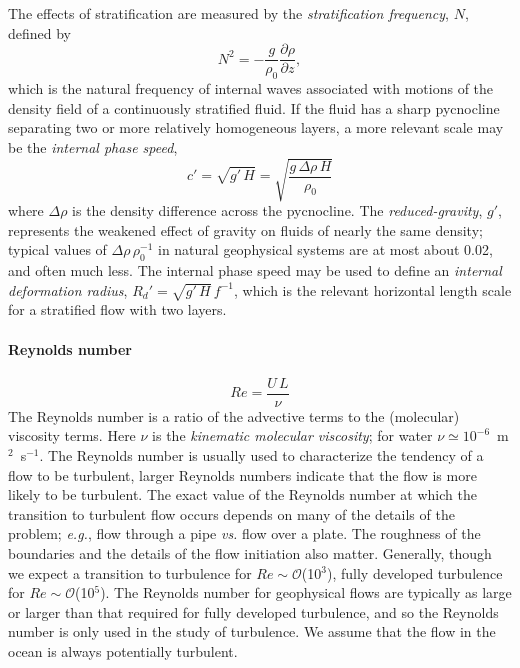 \documentclass[11pt]{report}
\numberwithin{equation}{section}
\begin{document}
The effects of stratification are measured by the {\it stratification frequency}, $N$, defined by
\begin{equation}
    N^2 = -\frac{g}{\rho_0}\frac{\partial \rho}{\partial z},
\end{equation}
which is the natural frequency of internal waves associated with motions of the density field of a continuously stratified fluid.  If the fluid has a sharp pycnocline separating two or more relatively homogeneous layers, a more relevant scale may be the {\it internal phase speed},
\begin{equation}
    c' = \sqrt{g'\,H} = \sqrt{\frac{g\,\Delta\rho\,H}{\rho_0}}
\end{equation}
where $\Delta\rho$ is the density difference across the pycnocline.  The {\it reduced-gravity}, $g'$, represents the weakened effect of gravity on fluids of nearly the same density; typical values of $\Delta\rho\,\rho_0^{-1}$ in natural geophysical systems are at most about 0.02, and often much less.  The internal phase speed may be used to define an {\it internal deformation radius}, $R_d'=\sqrt{g'\,H}\,f^{-1}$, which is the relevant horizontal length scale for a stratified flow with two layers.  

\paragraph{Reynolds number} 
\begin{equation}
    Re = \frac{U\,L}{\nu}
\end{equation}
The Reynolds number is a ratio of the advective terms to the (molecular) viscosity terms.  Here $\nu$ is the {\it kinematic molecular viscosity}; for water $\nu\simeq10^{-6}$~m$^2$~s$^{-1}$.  The Reynolds number is usually used to characterize the tendency of a flow to be turbulent, larger Reynolds numbers indicate that the flow is more likely to be turbulent.  The exact value of the Reynolds number at which the transition to turbulent flow occurs depends on many of the details of the problem; \emph{e.g.}, flow through a pipe {\it vs.} flow over a plate.  The roughness of the boundaries and the details of the flow initiation also matter.  Generally, though we expect a transition to turbulence for $Re\sim\mathcal{O}$(10$^3$), fully developed turbulence for $Re\sim\mathcal{O}$(10$^5$).  The Reynolds number for geophysical flows are typically as large or larger than that required for fully developed turbulence, and so the Reynolds number is only used in the study of turbulence.  We assume that the flow in the ocean is always potentially turbulent.
\end{document}

